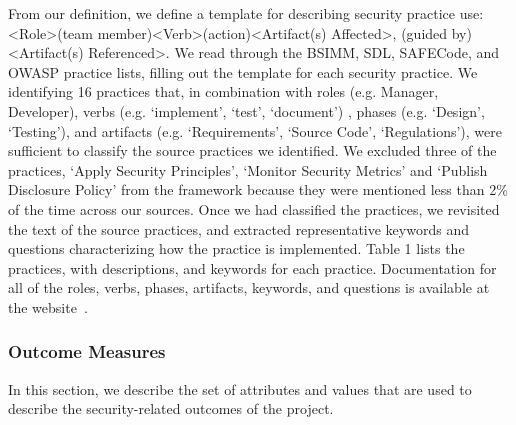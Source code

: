 From our definition, we define a template for describing security practice use: <Role>(team member)<Verb>(action)<Artifact(s) Affected>, (guided by)<Artifact(s) Referenced>. We read through the BSIMM, SDL, SAFECode, and OWASP practice lists, filling out the template for each security practice. We identifying 16 practices that, in combination with roles (e.g. Manager, Developer), verbs (e.g. ‘implement’, ‘test’, ‘document’) , phases (e.g. ‘Design’, ‘Testing’), and artifacts (e.g. ‘Requirements’, ‘Source Code’, ‘Regulations’), were sufficient to classify the source practices we identified. We excluded three of the practices, ‘Apply Security Principles’,  ‘Monitor Security Metrics’ and ‘Publish Disclosure Policy’ from the framework because they were mentioned less than 2\% of the time across our sources.
Once we had classified the practices, we revisited the text of the source practices, and extracted representative keywords and questions characterizing how the practice is implemented. 
 Table 1 lists the practices, with descriptions, and keywords for each practice. Documentation for all of the roles, verbs, phases, artifacts, keywords, and questions is available at the website~\cite{morrison2016spefsite}.

\subsubsection{Outcome Measures}
In this section, we describe the set of attributes and values that are used to describe the security-related outcomes of the project. 

